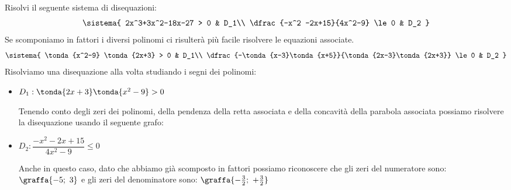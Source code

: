 \begin{esempio}
 
Risolvi il seguente sistema di disequazioni:
\[\sistema{
    2x^3+3x^2-18x-27 > 0 & D_1\\
    \dfrac{-x^2 -2x+15}{4x^2-9} \le 0 & D_2
  }
\]
Se scomponiamo in fattori i diversi polinomi ci risulterà più facile 
risolvere le equazioni associate.
\[\sistema{
    \tonda{x^2-9} \tonda{2x+3} > 0 & D_1\\
    \dfrac{-\tonda{x-3}\tonda{x+5}}{\tonda{2x-3}\tonda{2x+3}} \le 0 & D_2
  }
\]
Risolviamo una disequazione alla volta studiando i segni dei polinomi:

\begin{itemize}
 \item \(D_1: \tonda{2x+3} \tonda{x^2-9}>0\)

\begin{minipage}{.49\textwidth}
Tenendo conto degli zeri dei polinomi, della pendenza della retta associata 
e della concavità della parabola associata possiamo risolvere la disequazione 
usando il seguente grafo:
\end{minipage}
\hfill
\begin{minipage}{.49\textwidth}
\begin{center} \segnosistemaaa \end{center}
\end{minipage}

 \item \(D_2: \dfrac{-x^2 -2x+15}{4x^2-9} \le 0\)

Anche in questo caso, dato che abbiamo già scomposto in fattori possiamo 
riconoscere che gli zeri del numeratore sono:
\(\graffa{-5;~3}\) 
e gli zeri del denominatore sono:
\(\graffa{-\frac{3}{2};~+\frac{3}{2}}\) 

\end{itemize}


\end{esempio}
